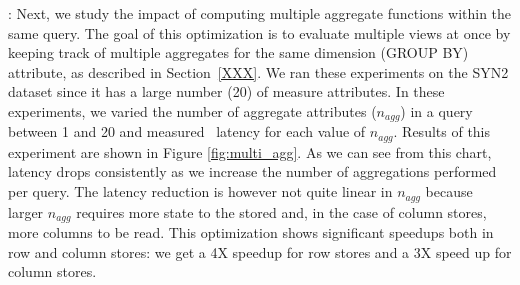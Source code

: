 
: Next, we study the impact of
computing multiple aggregate functions within the same query.
The goal of this optimization is to evaluate multiple views at once by keeping
track of multiple aggregates for the same dimension (GROUP BY) attribute, as
described in Section~\ref{XXX}.
We ran these experiments on the SYN2 dataset since it has a large number (20) of
measure attributes.
In these experiments, we varied the number of aggregate attributes ($n_{agg}$)
in a query between 1 and 20 and measured \VizRecDB\ latency for each value of
$n_{agg}$.
Results of this experiment are shown in Figure \ref{fig:multi_agg}.
As we can see from this chart, latency drops consistently as we increase the
number of aggregations performed per query.
The latency reduction is however not quite linear in $n_{agg}$ because larger
$n_{agg}$ requires more state to the stored and, in the case of column stores, more
columns to be read.
This optimization shows significant speedups both in row and column stores: we
get a 4X speedup for row stores and a 3X speed up for column stores.\\


